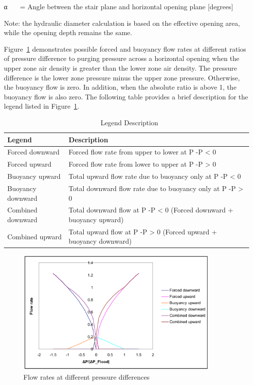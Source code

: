 α~~~ = Angle between the stair plane and horizontal opening plane {[}degrees{]}

Note: the hydraulic diameter calculation is based on the effective opening area, while the opening depth remains the same.

Figure~\ref{fig:flow-rates-at-different-pressure-differences} demonstrates possible forced and buoyancy flow rates at different ratios of pressure difference to purging pressure across a horizontal opening when the upper zone air density is greater than the lower zone air density. The pressure difference is the lower zone pressure minus the upper zone pressure. Otherwise, the buoyancy flow is zero. In addition, when the absolute ratio is above 1, the buoyancy flow is also zero. The following table provides a brief description for the legend listed in Figure~\ref{fig:flow-rates-at-different-pressure-differences}.

\begin{longtable}[c]{p{1.5in}p{4.5in}}
\caption{  Legend Description \protect \label{table:legend-description}}\\
\toprule 
Legend & Description \tabularnewline \midrule
\endhead
Forced downward & Forced flow rate from upper to lower at P  -P    <  0 \tabularnewline
Forced upward & Forced flow rate from lower to upper at P  -P    >  0 \tabularnewline
Buoyancy upward & Total upward flow rate due to buoyancy only at P  -P    <  0 \tabularnewline
Buoyancy downward & Total downward flow rate due to buoyancy only at P  -P    >  0 \tabularnewline
Combined downward & Total downward flow at P  -P    <  0 (Forced downward + buoyancy upward) \tabularnewline
Combined upward & Total upward flow at P  -P    >  0 (Forced upward + buoyancy downward) \tabularnewline
\bottomrule
\end{longtable}

\begin{figure}[hbtp] %
\centering
\includegraphics[width=0.9\textwidth, height=0.9\textheight, keepaspectratio=true]{media/image2743.svg.png}
\caption{Flow rates at different pressure differences \protect \label{fig:flow-rates-at-different-pressure-differences}}
\end{figure}

